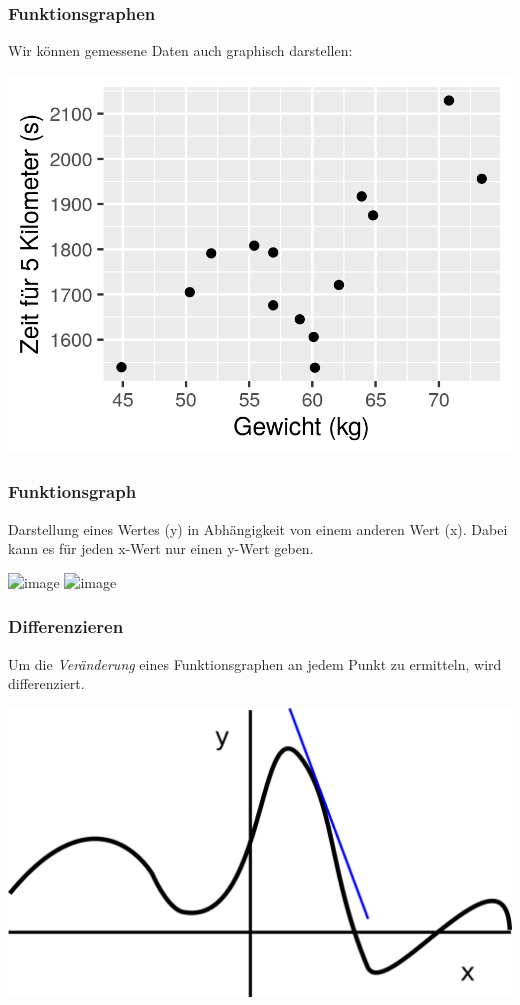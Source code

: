 \documentclass{beamer}
\begin{document}
\begin{frame}
\frametitle{Funktionsgraphen}

Wir können  gemessene Daten auch graphisch darstellen:

\begin{center}
\includegraphics{zeit_vs_gewicht.png}
\end{center}

\end{frame}


\begin{frame}
\frametitle{Funktionsgraph}

Darstellung eines Wertes (y) in Abhängigkeit von einem anderen Wert (x). Dabei kann es für jeden x-Wert nur einen y-Wert geben. 

\begin{center}
\includegraphics<1>{zeit_vs_gewicht_regression.png}
\includegraphics<2>{function.png}
\end{center}

\end{frame}


\begin{frame}
\frametitle{Differenzieren}

Um die \emph{Veränderung} eines Funktionsgraphen an jedem Punkt zu ermitteln, wird differenziert.

\begin{center}
\includegraphics{function_diff.png}
\end{center}


\end{frame}
\end{document}
